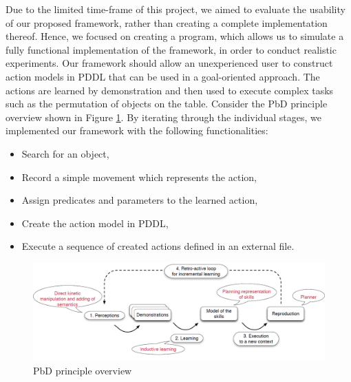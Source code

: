 Due to the limited time-frame of this project, we aimed to evaluate the usability of our proposed framework, rather than creating a complete implementation thereof. Hence, we focused on creating a program, which allows us to simulate a fully functional implementation of the framework, in order to conduct realistic experiments.
Our framework should allow an unexperienced user to construct action models in PDDL that can be used in a goal-oriented approach. The actions are learned by demonstration and then used to execute complex tasks such as the permutation of objects on the table. 
Consider the PbD principle overview shown in Figure \ref{fig:Baxter-Case-Study}.
By iterating through the individual stages, we implemented our framework with the following functionalities:
\begin{itemize}
\item Search for an object,
\item Record a simple movement which represents the action,
\item Assign predicates and parameters to the learned action,
\item Create the action model in PDDL,
\item Execute a sequence of created actions defined in an external file.
\end{itemize}

  \begin{figure}[ht]
    \centering
    \includegraphics[scale=0.45]{figures/Baxter-Case-Study}
    \caption{PbD principle overview}
    \label{fig:Baxter-Case-Study}
  \end{figure}


